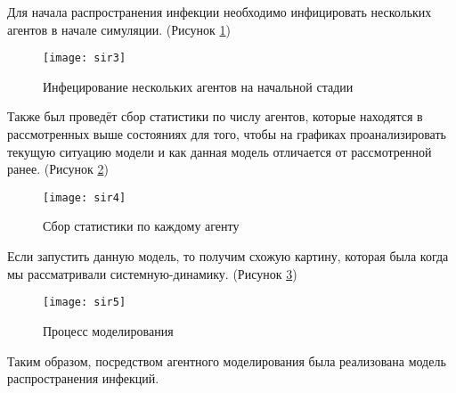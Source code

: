 Для начала распространения инфекции необходимо инфицировать нескольких агентов в начале симуляции. (Рисунок \ref{fig:sir3})
\begin{figure}[h]
	\centering \texttt{[image: sir3]}
	\caption{Инфецирование нескольких агентов на начальной стадии}
	\label{fig:sir3}
\end{figure}

Также был проведёт сбор статистики по числу агентов, которые находятся в рассмотренных выше состояниях для того, чтобы на графиках проанализировать текущую ситуацию модели и как данная модель отличается от рассмотренной ранее. (Рисунок \ref{fig:sir4})
\begin{figure}[h]
	\centering \texttt{[image: sir4]}
	\caption{Сбор статистики по каждому агенту}
	\label{fig:sir4}
\end{figure}

\newpage

Если запустить данную модель, то получим схожую картину, которая была когда мы рассматривали системную-динамику. (Рисунок \ref{fig:sir5})
\begin{figure}[h]
	\centering \texttt{[image: sir5]}
	\caption{Процесс моделирования}
	\label{fig:sir5}
\end{figure}

Таким образом, посредством агентного моделирования была реализована модель распространения инфекций.